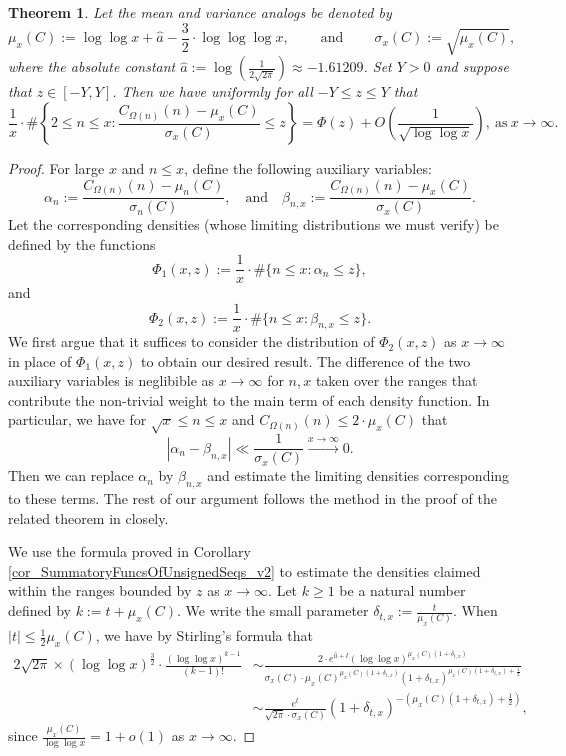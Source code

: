 \documentclass[11pt,reqno,a4letter]{article}
\numberwithin{figure}{section}
\numberwithin{table}{section}
\theoremstyle{plain}
\newtheorem{theorem}{Theorem}
\numberwithin{theorem}{section}
\theoremstyle{definition}
\begin{document}
\begin{theorem} 
\label{theorem_CLT_VI} 
Let the mean and variance analogs be denoted by 
\[
\mu_x(C) := \log\log x + \hat{a} - \frac{3}{2} \cdot \log\log\log x, 
     \qquad \mathrm{\ and\ } \qquad 
     \sigma_x(C) := \sqrt{\mu_x(C)}, 
\]
where the absolute constant 
$\hat{a} := \log\left(\frac{1}{2\sqrt{2\pi}}\right) \approx -1.61209$. 
Set $Y > 0$ and suppose that $z \in [-Y, Y]$. Then we have 
uniformly for all $-Y \leq z \leq Y$ that 
\[
\frac{1}{x} \cdot \#\left\{2 \leq n \leq x: 
     \frac{C_{\Omega(n)}(n) - \mu_x(C)}{\sigma_x(C)} \leq z\right\} = 
     \Phi(z) + O\left(\frac{1}{\sqrt{\log\log x}}\right), 
     \mathrm{\ as\ } x \rightarrow \infty. 
\] 
\end{theorem} 
\begin{proof} 
For large $x$ and $n \leq x$, define the following auxiliary variables: 
\[
\alpha_n := \frac{C_{\Omega(n)}(n) - \mu_n(C)}{\sigma_n(C)}, \quad\mathrm{and}\quad 
     \beta_{n,x} := \frac{C_{\Omega(n)}(n) - \mu_x(C)}{\sigma_x(C)}. 
\] 
Let the corresponding densities (whose limiting distributions we must verify) 
be defined by the functions 
\[
\Phi_1(x, z) := \frac{1}{x} \cdot \#\{n \leq x: \alpha_n \leq z\}, 
\]
and 
\[
\Phi_2(x, z) := \frac{1}{x} \cdot \#\{n \leq x: \beta_{n,x} \leq z\}. 
\] 
We first argue that it suffices to consider the distribution of $\Phi_2(x, z)$ as 
$x \rightarrow \infty$ in place of $\Phi_1(x, z)$ to obtain our desired result. 
The difference of the two auxiliary variables is neglibible as 
$x \rightarrow \infty$ for $n,x$ taken over the ranges that contribute the non-trivial 
weight to the main term of each density function. In particular, we have for 
$\sqrt{x} \leq n \leq x$ and $C_{\Omega(n)}(n) \leq 2 \cdot \mu_x(C)$ that 
\[
|\alpha_n - \beta_{n,x}| \ll \frac{1}{\sigma_x(C)} \xrightarrow{x \rightarrow \infty} 0. 
\]
Then we can replace $\alpha_n$ by $\beta_{n,x}$ and estimate the limiting 
densities corresponding to these terms. 
The rest of our argument follows the method in the proof of the related theorem in 
\cite[Thm.\ 7.21; \S 7.4]{MV} closely. 

We use the formula proved in Corollary \ref{cor_SummatoryFuncsOfUnsignedSeqs_v2} 
to estimate the densities claimed within the ranges bounded by 
$z$ as $x \rightarrow \infty$. 
Let $k \geq 1$ be a natural number defined by $k := t + \mu_x(C)$. 
We write the small parameter $\delta_{t,x} := \frac{t}{\mu_x(C)}$. 
When $|t| \leq \frac{1}{2} \mu_x(C)$, we have by Stirling's formula that 
\begin{align*} 
2\sqrt{2\pi} \times (\log\log x)^{\frac{3}{2}} \cdot 
     \frac{(\log\log x)^{k-1}}{(k-1)!} & \sim 
     \frac{2 \cdot e^{\hat{a} + t} 
     (\log\log x)^{\mu_x(C)(1+\delta_{t,x})}}{ 
     \sigma_x(C) \cdot \mu_x(C)^{\mu_x(C) (1 + \delta_{t,x})}
     (1 + \delta_{t,x})^{\mu_x(C) (1 + \delta_{t,x}) + \frac{1}{2}}} \\ 
     & \sim \frac{e^{t}}{\sqrt{2\pi} \cdot \sigma_x(C)} (1 + \delta_{t,x})^{-\left( 
     \mu_x(C) (1 + \delta_{t,x}) + \frac{1}{2}\right)}, 
\end{align*} 
since $\frac{\mu_x(C)}{\log\log x} = 1 + o(1)$ as $x \rightarrow \infty$. 


\end{proof}
\end{document}
